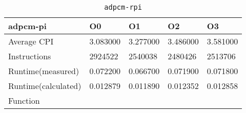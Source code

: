 \begin{table}[ht!]
\centering
\caption{\texttt{adpcm-rpi}}
\label{tab:adpcm-rpi}
\begin{tabular}{|l|l|l|l|l|}
\hline
\textbf{adpcm-pi}	&	\textbf{O0}	&	\textbf{O1}	&	\textbf{O2}	&	\textbf{O3}	\\\hline\hline
Average CPI	&	3.083000	&	3.277000	&	3.486000	&	3.581000	\\\hline
Instructions	&	2924522	&	2540038	&	2480426	&	2513706	\\\hline
Runtime(measured)	&	0.072200	&	0.066700	&	0.071900	&	0.071800	\\\hline
Runtime(calculated)	&	0.012879	&	0.011890	&	0.012352	&	0.012858	\\\hline
Function	&		&		&		&		\\\hline
\end{tabular}
\end{table}
